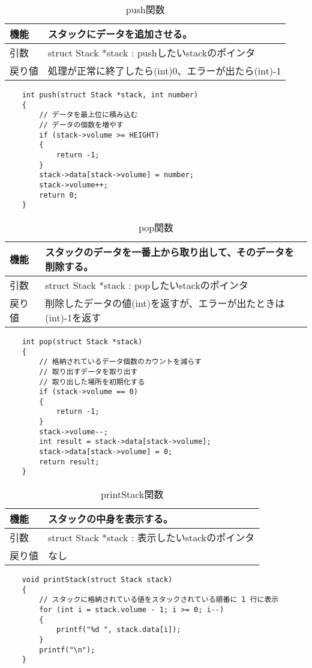 \documentclass[dvipdfmx]{jsarticle}
\begin{document}
\begin{table}[ht]
  \centering
  \begin{tabular}{|p{5cm}|p{10cm}|}
    \hline
    機能  & スタックにデータを追加させる。                         \\
    \hline
    引数  & struct Stack *stack : pushしたいstackのポインタ \\
    \hline
    戻り値 & 処理が正常に終了したら(int)0、エラーが出たら(int)-1                  \\
  \end{tabular}
  \begin{lstlisting}
    int push(struct Stack *stack, int number)
    {
        // データを最上位に積み込む
        // データの個数を増やす
        if (stack->volume >= HEIGHT)
        {
            return -1;
        }
        stack->data[stack->volume] = number;
        stack->volume++;
        return 0;
    }
  \end{lstlisting}
  \caption{push関数}
  \label{tab:push_func}
\end{table}
\begin{table}[ht]
  \centering
  \begin{tabular}{|p{5cm}|p{10cm}|}
    \hline
    機能  & スタックのデータを一番上から取り出して、そのデータを削除する。        \\
    \hline
    引数  & struct Stack *stack : popしたいstackのポインタ \\
    \hline
    戻り値 & 削除したデータの値(int)を返すが、エラーが出たときは(int)-1を返す \\
  \end{tabular}
  \begin{lstlisting}
    int pop(struct Stack *stack)
    {
        // 格納されているデータ個数のカウントを減らす
        // 取り出すデータを取り出す
        // 取り出した場所を初期化する
        if (stack->volume == 0)
        {
            return -1;
        }
        stack->volume--;
        int result = stack->data[stack->volume];
        stack->data[stack->volume] = 0;
        return result;
    }
  \end{lstlisting}
  \caption{pop関数}
  \label{tab:pop_func}
\end{table}
\begin{table}[ht]
  \centering
  \begin{tabular}{|p{5cm}|p{10cm}|}
    \hline
    機能  & スタックの中身を表示する。                         \\
    \hline
    引数  & struct Stack *stack : 表示したいstackのポインタ \\
    \hline
    戻り値 & なし                                    \\
  \end{tabular}
  \begin{lstlisting}
    void printStack(struct Stack stack)
    {
        // スタックに格納されている値をスタックされている順番に 1 行に表示
        for (int i = stack.volume - 1; i >= 0; i--)
        {
            printf("%d ", stack.data[i]);
        }
        printf("\n");
    }
  \end{lstlisting}
  \caption{printStack関数}
  \label{tab:printstack_func}
\end{table}
\end{document}
